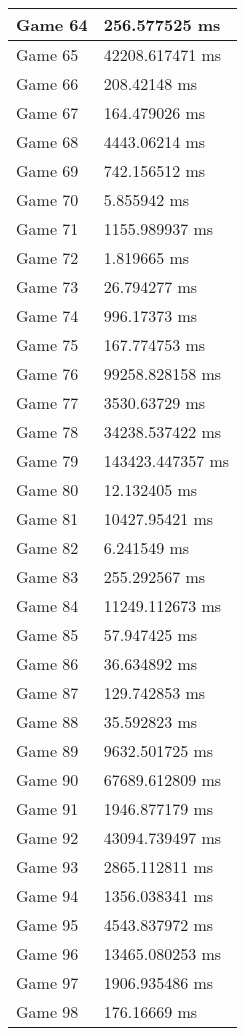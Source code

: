 \begin{multicols}{2}
\begin{tabular}{|l|l|}
	Game 64 & 256.577525 ms \\ \hline
	Game 65 & 42208.617471 ms \\ \hline
	Game 66 & 208.42148 ms \\ \hline
	Game 67 & 164.479026 ms \\ \hline
	Game 68 & 4443.06214 ms \\ \hline
	Game 69 & 742.156512 ms \\ \hline
	Game 70 & 5.855942 ms \\ \hline
	Game 71 & 1155.989937 ms \\ \hline
	Game 72 & 1.819665 ms \\ \hline
	Game 73 & 26.794277 ms \\ \hline
	Game 74 & 996.17373 ms \\ \hline
	Game 75 & 167.774753 ms \\ \hline
	Game 76 & 99258.828158 ms \\ \hline
	Game 77 & 3530.63729 ms \\ \hline
	Game 78 & 34238.537422 ms \\ \hline
	Game 79 & 143423.447357 ms \\ \hline
	Game 80 & 12.132405 ms \\ \hline
	Game 81 & 10427.95421 ms \\ \hline
	Game 82 & 6.241549 ms \\ \hline
	Game 83 & 255.292567 ms \\ \hline
	Game 84 & 11249.112673 ms \\ \hline
	Game 85 & 57.947425 ms \\ \hline
	Game 86 & 36.634892 ms \\ \hline
	Game 87 & 129.742853 ms \\ \hline
	Game 88 & 35.592823 ms \\ \hline
	Game 89 & 9632.501725 ms \\ \hline
	Game 90 & 67689.612809 ms \\ \hline
	Game 91 & 1946.877179 ms \\ \hline
	Game 92 & 43094.739497 ms \\ \hline
	Game 93 & 2865.112811 ms \\ \hline
	Game 94 & 1356.038341 ms \\ \hline
	Game 95 & 4543.837972 ms \\ \hline
	Game 96 & 13465.080253 ms \\ \hline
	Game 97 & 1906.935486 ms \\ \hline
	Game 98 & 176.16669 ms \\ \hline

\end{tabular}
\end{multicols}
